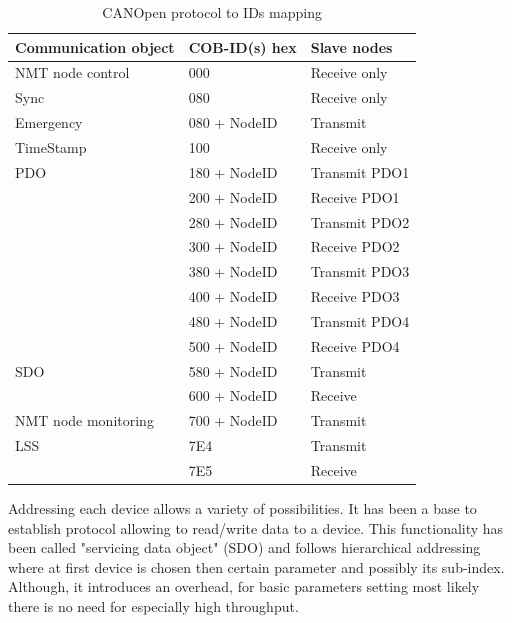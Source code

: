 \begin{table}[H]
    \centering
    \begin{tabular}{|p{}|p{}|p{}|}
        \hline
        \textbf{Communication object} & \textbf{COB-ID(s) hex} & \textbf{Slave nodes} \\
        \hline
        NMT node control & 000 & Receive only \\
        \hline
        Sync & 080 & Receive only \\
        \hline
        Emergency & 080 + NodeID & Transmit \\
        \hline
        TimeStamp & 100 & Receive only \\
        \hline
        PDO & 180 + NodeID & Transmit PDO1 \\
            & 200 + NodeID & Receive PDO1 \\
            & 280 + NodeID & Transmit PDO2 \\
            & 300 + NodeID & Receive PDO2 \\
            & 380 + NodeID & Transmit PDO3 \\
            & 400 + NodeID & Receive PDO3 \\
            & 480 + NodeID & Transmit PDO4 \\
            & 500 + NodeID & Receive PDO4 \\
        \hline
        SDO & 580 + NodeID & Transmit \\
            & 600 + NodeID & Receive \\
        \hline
        NMT node monitoring & 700 + NodeID & Transmit \\
        \hline
        LSS & 7E4 & Transmit \\
            & 7E5 & Receive \\
        \hline
    \end{tabular}
    \caption{CANOpen protocol to IDs mapping\cite{CANOpen_microcontrol}}
    \label{tab:my_label}
\end{table}

Addressing each device allows a variety of possibilities. It has been a base to establish protocol allowing to read/write data to a device.
This functionality has been called "servicing data object" (SDO) and follows hierarchical addressing where at first device is chosen then certain parameter and possibly its sub-index. Although, it introduces an overhead, for basic parameters setting most likely there is no need for especially high throughput. 

